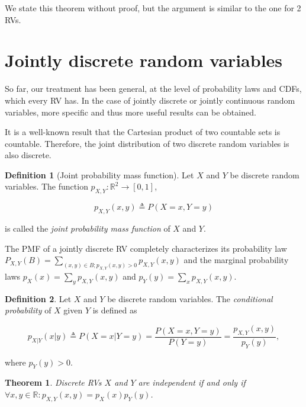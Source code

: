 \documentclass{book}
\theoremstyle{plain}%
\newtheorem{theorem}{Theorem}[section]
\theoremstyle{definition}
\newtheorem{definition}{Definition}[section]
\newlength{\arrow}
\begin{document}
We state this theorem without proof, but the argument is similar to the one for 2 RVs.

\section{Jointly discrete random variables}

So far, our treatment has been general, at the level of probability laws and CDFs, which every RV has. In the case of jointly discrete or jointly continuous random variables, more specific and thus more useful results can be obtained.

It is a well-known result that the Cartesian product of two countable sets is countable. Therefore, the joint distribution of two discrete random variables is also discrete.

\begin{definition}[Joint probability mass function]
Let $X$ and $Y$ be discrete random variables. The function $p_{X,Y}: \mathbb{R}^2 \rightarrow [0,1]$, 

$$p_{X,Y}(x,y) \triangleq P(X = x, Y = y)$$ 

is called the \emph{joint probability mass function} of $X$ and $Y$.
\end{definition}

The PMF of a jointly discrete RV completely characterizes its probability law $P_{X,Y}(B) = \sum_{(x,y) \in B; p_{X,Y}(x,y) > 0} p_{X,Y}(x,y)$ and the marginal probability laws $p_X(x) = \sum_y  p_{X,Y}(x,y)$ and $p_Y(y) = \sum_x p_{X,Y}(x,y)$.

\begin{definition}
Let $X$ and $Y$ be discrete random variables. The \emph{conditional probability} of $X$ given $Y$ is defined as

$$p_{X|Y}(x|y) \triangleq P(X = x|Y = y) = \frac{P(X=x, Y=y)}{P(Y=y)} = \frac{p_{X,Y}(x, y)}{p_Y(y)},$$

where $p_Y(y) > 0$.
\end{definition}

\begin{theorem}
Discrete RVs $X$ and $Y$ are independent if and only if $\forall x,y \in \mathbb{R}: p_{X,Y}(x,y) = p_X(x)p_Y(y)$.
\end{theorem}
\end{document}
